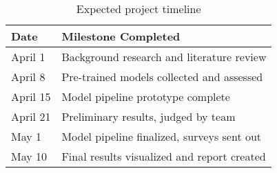 \documentclass{article}
\begin{document}

\begin{table}[h]
\centering
\begin{tabular}{|l|l|}
\hline
\textbf{Date} & \textbf{Milestone Completed}                \\ \hline
April 1       & Background research and literature review     \\ \hline
April 8       & Pre-trained models collected and assessed \\ \hline
April 15      & Model pipeline prototype complete
\\ \hline
April 21      & Preliminary results, judged by team         \\ \hline
May 1         & Model pipeline finalized, surveys sent out  \\ \hline
May 10        & Final results visualized and report created \\ \hline
\end{tabular}
\caption{Expected project timeline}
\end{table}






\newpage





\end{document}
